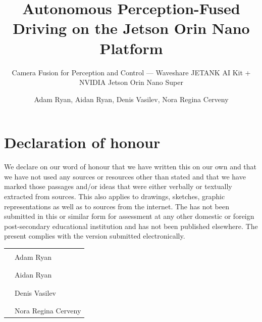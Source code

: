 \documentclass{imc-inf}
\title{Autonomous Perception-Fused Driving on the Jetson Orin Nano Platform}
\subtitle{Camera Fusion for Perception and Control --- Waveshare JETANK AI Kit + NVIDIA Jetson Orin Nano Super}
\author{Adam Ryan, Aidan Ryan, Denis Vasilev, Nora Regina Cerveny}
\begin{document}
\frontmatter\maketitle{}

\chapter*{Declaration of honour}

We declare on our word of honour that we have written this \thesistype{} on our own and that we have not used any sources or resources other than stated and that we have marked those passages and/or ideas that were either verbally or textually extracted from sources. This also applies to drawings, sketches, graphic representations as well as to sources from the internet. The \thesistype{} has not been submitted in this or similar form for assessment at any other domestic or foreign post-secondary educational institution and has not been published elsewhere. The present \thesistype{} complies with the version submitted electronically.

\vspace{3em}

\begin{tabular}{@{}p{.5in}p{3in}@{}}
 & \hrulefill \\
 & Adam Ryan \\
 & \\[1.5em]
 & \hrulefill \\
 & Aidan Ryan \\
 & \\[1.5em]
 & \hrulefill \\
 & Denis Vasilev \\
 & \\[1.5em]
 & \hrulefill \\
 & Nora Regina Cerveny \\
\end{tabular}

\newpage
\end{document}
